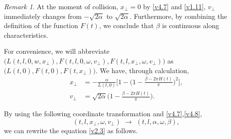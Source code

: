 \documentclass[11pt,reqno]{amsart}%
\theoremstyle{definition}
\theoremstyle{remark}
\newtheorem{Remark}{Remark}[section]
\begin{document}
\begin{Remark}
 At the moment of collision,  $x_{\bot}=0$ by \eqref{v4.7} and \eqref{v1.11},  $v_{\bot}$ immediately changes from $-\sqrt{2 \alpha}$ to $\sqrt{2 \alpha}$. Furthermore, by combining the definition of the function $F(t)$, we conclude that $\beta$ is continuous along characteristics.
\end{Remark}

 For convenience, we will abbreviate $\big(L(t,l,0,w,x_{\bot}),F(t,l,0,\omega,v_{\bot}),F(t,l,x_{\bot},\omega,v_{\bot})\big)$
 as $ \big(L(t,0),F(t,0),F(t,x_{\bot})\big)$.  We have, through calculation,
\begin{align}
x_{\bot}&=-\frac{\alpha}{L(t,0)}\Big[1-\big(1-\frac{\beta-2\pi H(t)}{\pi}\big)^{2}\Big],\nonumber\\
v_{\bot}&=\sqrt{2\alpha}\Big(1-\frac{\beta-2\pi H(t)}{\pi}\Big).\nonumber
\end{align}

By using the following coordinate transformation and \eqref{v4.7},\eqref{v4.8},
$$(t,l, x_{\bot},\omega,v_{\bot})\,\,\longrightarrow \,\,(t,l,\alpha,\omega,\beta),$$
 we can rewrite the equation \eqref{v2.3} as follows.
 
\end{document}
